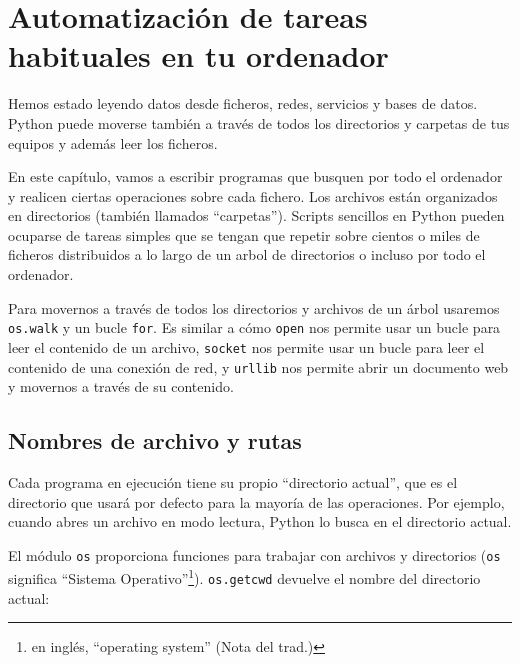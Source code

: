 
\chapter{Automatización de tareas habituales en tu ordenador}

Hemos estado leyendo datos desde ficheros, redes, servicios y
bases de datos. Python puede moverse también a través de todos los
directorios y carpetas de tus equipos y además leer
los ficheros.

En este capítulo, vamos a escribir programas que busquen
por todo el ordenador y
realicen ciertas operaciones sobre cada fichero.
Los archivos están organizados en directorios (también llamados ``carpetas'').
Scripts sencillos en Python
pueden ocuparse de tareas simples que se tengan que repetir
sobre cientos o miles de ficheros
distribuidos a lo largo de un arbol de directorios o incluso por todo el ordenador.

Para movernos a través de todos los directorios y archivos de un árbol usaremos
{\tt os.walk} y un bucle {\tt for}. Es similar a cómo
{\tt open} nos permite usar un bucle para leer el contenido de un archivo,
{\tt socket} nos permite usar un bucle para leer el contenido de una conexión de red, y
{\tt urllib} nos permite abrir un documento web y movernos a través de su contenido. 

\section{Nombres de archivo y rutas}
\label{paths}


Cada programa en ejecución tiene su propio ``directorio actual'', que es el directorio que
usará por defecto para la mayoría de las operaciones. Por ejemplo, cuando abres un archivo
en modo lectura, Python lo busca en el directorio actual.


El módulo {\tt os} proporciona funciones para trabajar con archivos y
directorios ({\tt os} significa ``Sistema Operativo''\footnote{en inglés, ``operating system''
(Nota del trad.)}).
{\tt os.getcwd} devuelve el nombre del directorio actual:


